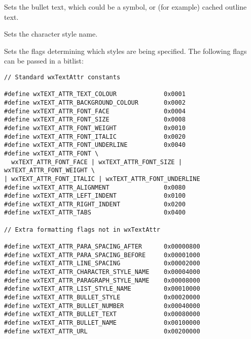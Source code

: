 
Sets the bullet text, which could be a symbol, or (for example) cached outline text.

\label{wxrichtextattrsetcharacterstylename}


Sets the character style name.

\label{wxrichtextattrsetflags}


Sets the flags determining which styles are being specified. The following
flags can be passed in a bitlist:

{\small
\begin{verbatim}
// Standard wxTextAttr constants

#define wxTEXT_ATTR_TEXT_COLOUR             0x0001
#define wxTEXT_ATTR_BACKGROUND_COLOUR       0x0002
#define wxTEXT_ATTR_FONT_FACE               0x0004
#define wxTEXT_ATTR_FONT_SIZE               0x0008
#define wxTEXT_ATTR_FONT_WEIGHT             0x0010
#define wxTEXT_ATTR_FONT_ITALIC             0x0020
#define wxTEXT_ATTR_FONT_UNDERLINE          0x0040
#define wxTEXT_ATTR_FONT \
  wxTEXT_ATTR_FONT_FACE | wxTEXT_ATTR_FONT_SIZE | wxTEXT_ATTR_FONT_WEIGHT \
| wxTEXT_ATTR_FONT_ITALIC | wxTEXT_ATTR_FONT_UNDERLINE
#define wxTEXT_ATTR_ALIGNMENT               0x0080
#define wxTEXT_ATTR_LEFT_INDENT             0x0100
#define wxTEXT_ATTR_RIGHT_INDENT            0x0200
#define wxTEXT_ATTR_TABS                    0x0400

// Extra formatting flags not in wxTextAttr

#define wxTEXT_ATTR_PARA_SPACING_AFTER      0x00000800
#define wxTEXT_ATTR_PARA_SPACING_BEFORE     0x00001000
#define wxTEXT_ATTR_LINE_SPACING            0x00002000
#define wxTEXT_ATTR_CHARACTER_STYLE_NAME    0x00004000
#define wxTEXT_ATTR_PARAGRAPH_STYLE_NAME    0x00008000
#define wxTEXT_ATTR_LIST_STYLE_NAME         0x00010000
#define wxTEXT_ATTR_BULLET_STYLE            0x00020000
#define wxTEXT_ATTR_BULLET_NUMBER           0x00040000
#define wxTEXT_ATTR_BULLET_TEXT             0x00080000
#define wxTEXT_ATTR_BULLET_NAME             0x00100000
#define wxTEXT_ATTR_URL                     0x00200000
\end{verbatim}
}

\label{wxrichtextattrsetfontfacename}

